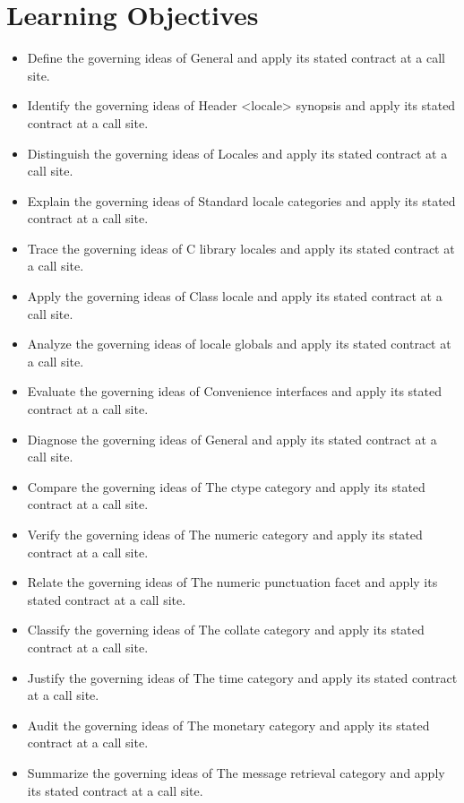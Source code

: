 \documentclass[11pt,letterpaper]{article}
\begin{document}
\section{Learning Objectives}
\begin{itemize}[label=\textcolor{CornellReferenceTeal}{$\blacktriangleright$}]
\item Define the governing ideas of General and apply its stated contract at a call site.
\item Identify the governing ideas of Header <locale> synopsis and apply its stated contract at a call site.
\item Distinguish the governing ideas of Locales and apply its stated contract at a call site.
\item Explain the governing ideas of Standard locale categories and apply its stated contract at a call site.
\item Trace the governing ideas of C library locales and apply its stated contract at a call site.
\item Apply the governing ideas of Class locale and apply its stated contract at a call site.
\item Analyze the governing ideas of locale globals and apply its stated contract at a call site.
\item Evaluate the governing ideas of Convenience interfaces and apply its stated contract at a call site.
\item Diagnose the governing ideas of General and apply its stated contract at a call site.
\item Compare the governing ideas of The ctype category and apply its stated contract at a call site.
\item Verify the governing ideas of The numeric category and apply its stated contract at a call site.
\item Relate the governing ideas of The numeric punctuation facet and apply its stated contract at a call site.
\item Classify the governing ideas of The collate category and apply its stated contract at a call site.
\item Justify the governing ideas of The time category and apply its stated contract at a call site.
\item Audit the governing ideas of The monetary category and apply its stated contract at a call site.
\item Summarize the governing ideas of The message retrieval category and apply its stated contract at a call site.
\end{itemize}
\end{document}
